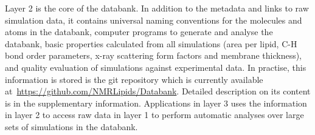 \documentclass[fleqn,10pt]{wlscirep}
\begin{document}
Layer 2 is the core of the databank. In addition to the metadata and links to raw simulation data, it contains universal naming conventions for the molecules and atoms in the databank, computer programs to generate and analyse the databank, basic properties calculated from all simulations (area per lipid, C-H bond order parameters, x-ray scattering form factors and membrane thickness), and quality evaluation of simulations against experimental data. In practise, this information is stored is the git repository which is currently available at~\url{https://github.com/NMRLipids/Databank}.
Detailed description on its content is in the supplementary information. Applications in layer 3 uses the information in layer 2 to access raw data in layer 1 to perform automatic analyses over large sets of simulations in the databank. 

\end{document}

